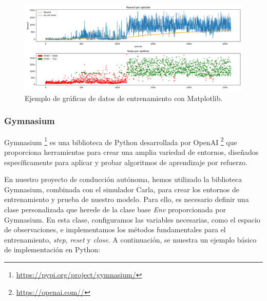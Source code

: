 \begin{figure}[ht]
  \begin{center}
    \includegraphics[width=14cm]{figs/Plataformas_Desarollo/plot.png}
  \end{center}
  \caption{Ejemplo de gráficas de datos de entrenamiento con Matplotlib.}
  \label{foto_plot}
\end{figure}

\subsubsection{Gymnasium}
\label{sec:gymnasium}

Gymnasium \footnote{\url{https://pypi.org/project/gymnasium/}}  es una biblioteca de Python desarrollada por OpenAI \footnote{\url{https://openai.com//}}  que proporciona herramientas para crear una amplia variedad de entornos, diseñados específicamente para aplicar y probar algoritmos de aprendizaje por refuerzo.

En nuestro proyecto de conducción autónoma, hemos utilizado la biblioteca Gymnasium, combinada con el simulador Carla, para crear los entornos de entrenamiento y prueba de nuestro modelo. Para ello, es necesario definir una clase personalizada que herede de la clase base \textit{Env} proporcionada por Gymnasium. En esta clase, configuramos las variables necesarias, como el espacio de observaciones, e implementamos los métodos fundamentales para el entrenamiento, \textit{step}, \textit{reset} y \textit{close}. A continuación, se muestra un ejemplo básico de implementación en Python:

